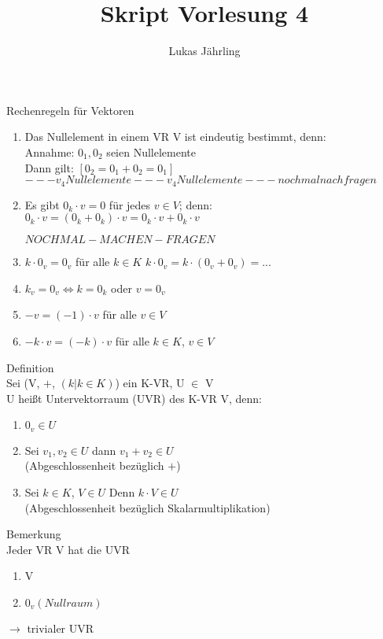 \documentclass{scrartcl}
\title{Skript Vorlesung 4}
\author{Lukas Jährling}
\begin{document}
	\large
	Rechenregeln für Vektoren
	\normalsize
	
	\begin{enumerate}
		\item 
		Das Nullelement in einem VR V ist eindeutig bestimmt, denn:\\
		Annahme: $0_1, 0_2$ seien Nullelemente\\
		Dann gilt: $[0_2 = 0_1 + 0_2 = 0_1]$\\
		$---v_4 Nullelemente --- v_4 Nullelemente --- nochmal nachfragen$
		
		
		\item
		Es gibt $0_k \cdot v = 0$ für jedes $v \in V$; denn:\\
		$0_k \cdot v = (0_k + 0_k) \cdot v = 0_k \cdot v + 0_k \cdot v$
		
		$NOCHMAL - MACHEN - FRAGEN$
		
		
		
		\item
		$k\cdot 0_v = 0_v$ für alle $k \in K$ \hspace{2 cm} $k\cdot 0_v = k \cdot (0_v + 0_v) = ...$
		\item
		$k_v = 0_v \Leftrightarrow k= 0_k$ oder $v = 0_v$
		
		\item
		$-v = (-1) \cdot v$ für alle $v \in V$
		
		\item
		$-k \cdot v = (-k) \cdot v$ für alle $k \in K$, $v \in V$
		
\end{enumerate}
	Definition\\
	Sei (V, $+$, $(k \vert k \in K)$) ein K-VR, U $\in$ V\\
	U heißt Untervektorraum (UVR) des K-VR V, denn:\\
	\begin{enumerate}
		\item $0_v \in U$
		\item Sei $v_1, v_2 \in U$ dann $v_1 +v_2 \in U$\\ (Abgeschlossenheit bezüglich $+$)
		\item Sei $k \in K$, $V \in U$ Denn $k \cdot V \in U$\\ (Abgeschlossenheit bezüglich Skalarmultiplikation)
	\end{enumerate}
	Bemerkung\\
	Jeder VR V hat die UVR
	\begin{enumerate}
		\item V
		\item ${0_v} (Nullraum)$
	\end{enumerate}
	$\rightarrow$ trivialer UVR
\end{document}
